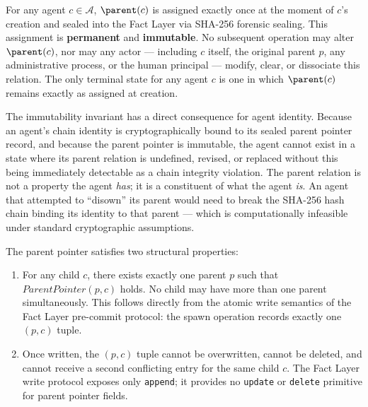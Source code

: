 \begin{invariant}
\label{inv:pp_immutability}
For any agent $c \in \mathcal{A}$, $\parent(c)$ is assigned exactly once at the moment of $c$'s creation and sealed into the Fact Layer via SHA-256 forensic sealing. This assignment is \textbf{permanent} and \textbf{immutable}. No subsequent operation may alter $\parent(c)$, nor may any actor — including $c$ itself, the original parent $p$, any administrative process, or the human principal — modify, clear, or dissociate this relation. The only terminal state for any agent $c$ is one in which $\parent(c)$ remains exactly as assigned at creation.
\end{invariant}

The immutability invariant has a direct consequence for agent identity. Because an agent's chain identity is cryptographically bound to its sealed parent pointer record, and because the parent pointer is immutable, the agent cannot exist in a state where its parent relation is undefined, revised, or replaced without this being immediately detectable as a chain integrity violation. The parent relation is not a property the agent \emph{has}; it is a constituent of what the agent \emph{is}. An agent that attempted to ``disown'' its parent would need to break the SHA-256 hash chain binding its identity to that parent — which is computationally infeasible under standard cryptographic assumptions.

The parent pointer satisfies two structural properties:

\begin{enumerate}
\item[\textbf{PP1 — Uniqueness:}] For any child $c$, there exists exactly one parent $p$ such that $\textit{ParentPointer}(p, c)$ holds. No child may have more than one parent simultaneously. This follows directly from the atomic write semantics of the Fact Layer pre-commit protocol: the spawn operation records exactly one $(p, c)$ tuple.

\item[\textbf{PP2 — Irreversibility:}] Once written, the $(p, c)$ tuple cannot be overwritten, cannot be deleted, and cannot receive a second conflicting entry for the same child $c$. The Fact Layer write protocol exposes only \texttt{append}; it provides no \texttt{update} or \texttt{delete} primitive for parent pointer fields.
\end{enumerate}


